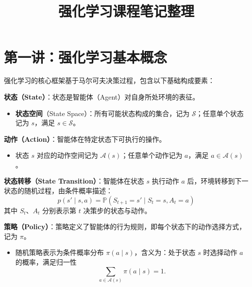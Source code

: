 \documentclass[UTF8]{article}
\title{\textbf{强化学习课程笔记整理}}
\author{}
\date{}
\begin{document}
\maketitle
\thispagestyle{empty}

\section{第一讲：强化学习基本概念}

强化学习的核心框架基于马尔可夫决策过程，包含以下基础构成要素：

\begin{definitionbox}
  \textbf{状态（State）}：状态是智能体（Agent）对自身所处环境的表征。
  \begin{itemize}
    \item \textbf{状态空间}（State Space）：所有可能状态构成的集合，记为 $\mathcal{S}$；任意单个状态记为 $s$，满足 $s \in \mathcal{S}$。
  \end{itemize}
\end{definitionbox}

\begin{definitionbox}
  \textbf{动作（Action）}：智能体在特定状态下可执行的操作。
  \begin{itemize}
    \item 状态 $s$ 对应的动作空间记为 $\mathcal{A}(s)$；任意单个动作记为 $a$，满足 $a \in \mathcal{A}(s)$。
  \end{itemize}
\end{definitionbox}

\begin{definitionbox}
  \textbf{状态转移（State Transition）}：智能体在状态 $s$ 执行动作 $a$ 后，环境转移到下一状态的随机过程，由条件概率描述：
  \[
    p(s' \mid s, a) = \mathbb{P}(S_{t+1}=s' \mid S_t=s, A_t=a)
  \]
  其中 $S_t$、$A_t$ 分别表示第 $t$ 决策步的状态与动作。
\end{definitionbox}

\begin{definitionbox}
  \textbf{策略（Policy）}：策略定义了智能体的行为规则，即每个状态下的动作选择方式，记为 $\pi$。
  \begin{itemize}
    \item 随机策略表示为条件概率分布 $\pi(a \mid s)$，含义为：处于状态 $s$ 时选择动作 $a$ 的概率，满足归一性
    \[
      \sum_{a \in \mathcal{A}(s)} \pi(a \mid s) = 1 .
    \]
  \end{itemize}
\end{definitionbox}
\end{document}
